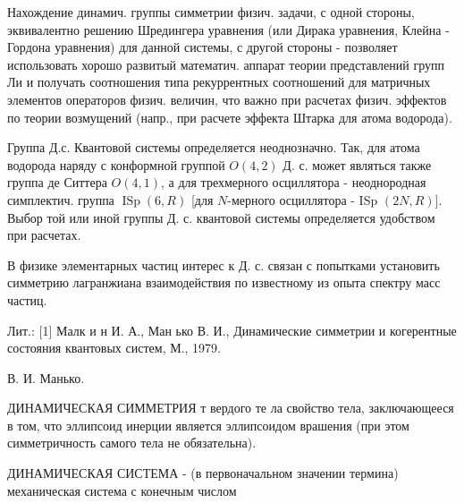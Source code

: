 \documentclass[10pt]{article}
\begin{document}
Нахождение динамич. группы симметрии физич. задачи, с одной стороны, эквивалентно решению Шредингера уравнения (или Дирака уравнения, Клейна - Гордона уравнения) для данной системы, с другой стороны - позволяет использовать хорошо развитый математич. аппарат теории представлений групп Ли и получать соотношения типа рекуррентных соотношений для матричных элементов операторов физич. величин, что важно при расчетах физич. эффектов по теории возмущений (напр., при расчете эффекта Штарка для атома водорода).



Группа Д.с. Квантовой системы определяется неоднозначно. Так, для атома водорода наряду с конформной группой $O(4,2)$ Д. с. может являться также группа де Ситтера $O(4,1)$, а для трехмерного осциллятора - неоднородная симплектич. группа $\operatorname{ISp}(6, R)$ [для $N$-мерного осциллятора - ISp $(2 N, R)]$. Выбор той или иной группы Д. с. квантовой системы определяется удобством при расчетах.



В физике элементарных частиц интерес к Д. с. связан с попытками установить симметрию лагранжиана взаимодействия по известному из опыта спектру масс частиц.



Лит.: [1] Малк и н И. А., Ман ько В. И., Динамические симметрии и когерентные состояния квантовых систем, М., 1979.



В. И. Манько.



ДИНАМИЧЕСКАЯ СИММЕТРИЯ т вердого те ла свойство тела, заключающееся в том, что эллипсоид инерции является эллипсоидом врашения (при этом симметричность самого тела не обязательна).



ДИНАМИЧЕСКАЯ СИСТЕМА - (в первоначальном значении термина) механическая система с конечным числом
\end{document}
